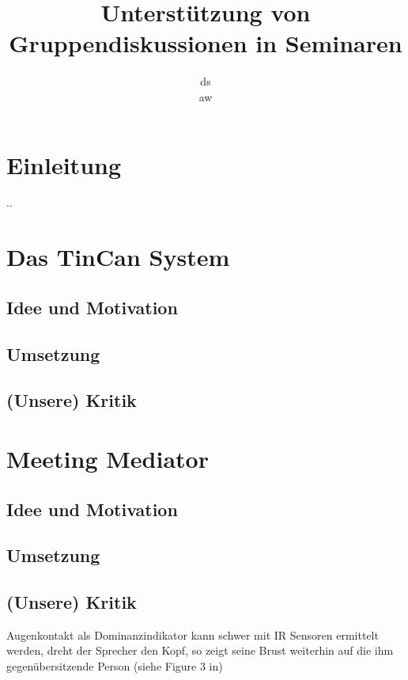 \documentclass{seminarvorlage}
\begin{document}
\title{Unterstützung von Gruppendiskussionen in Seminaren}
\author{
  \alignauthor ds\\
  \alignauthor aw\\
}

\maketitle


\section{Einleitung}
..
\section{Das TinCan System}
\subsection{Idee und Motivation}

\subsection{Umsetzung}
\subsection{(Unsere) Kritik}

\section{Meeting Mediator}
\subsection{Idee und Motivation}
\subsection{Umsetzung}
\subsection{(Unsere) Kritik}
Augenkontakt als Dominanzindikator kann schwer mit IR Sensoren ermittelt werden,
dreht der Sprecher den Kopf, so zeigt seine Brust weiterhin auf die ihm 
gegenübersitzende Person (siehe Figure 3 in)
\end{document}
